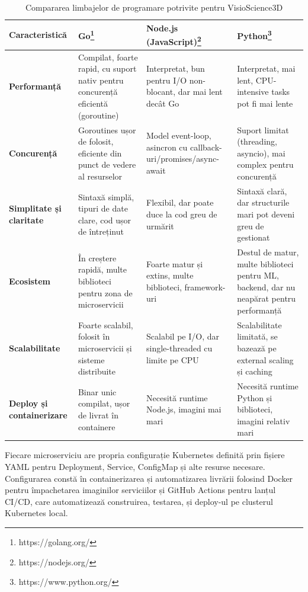 \begin{table}[h!]
\centering
\caption{Compararea limbajelor de programare potrivite pentru VisioScience3D}
\begin{tabular}{|p{2.5cm}|p{4cm}|p{4cm}|p{4cm}|}
\hline
\textbf{Caracteristică} & \textbf{Go\footnote{https://golang.org/}} & \textbf{Node.js (JavaScript)\footnote{https://nodejs.org/}} & \textbf{Python\footnote{https://www.python.org/}} \\
\hline
\textbf{Performanță} & Compilat, foarte rapid, cu suport nativ pentru concurență eficientă (goroutine) & Interpretat, bun pentru I/O non-blocant, dar mai lent decât Go & Interpretat, mai lent, CPU-intensive tasks pot fi mai lente \\
\hline
\textbf{Concurență} & Goroutines ușor de folosit, eficiente din punct de vedere al resurselor & Model event-loop, asincron cu callback-uri/promises/async-await & Suport limitat (threading, asyncio), mai complex pentru concurență \\
\hline
\textbf{Simplitate și claritate} & Sintaxă simplă, tipuri de date clare, cod ușor de întreținut & Flexibil, dar poate duce la cod greu de urmărit & Sintaxă clară, dar structurile mari pot deveni greu de gestionat \\
\hline
\textbf{Ecosistem} & În creștere rapidă, multe biblioteci pentru zona de microservicii & Foarte matur și extins, multe biblioteci, framework-uri & Destul de matur, multe biblioteci pentru ML, backend, dar nu neapărat pentru performanță \\
\hline
\textbf{Scalabilitate} & Foarte scalabil, folosit în microservicii și sisteme distribuite & Scalabil pe I/O, dar single-threaded cu limite pe CPU & Scalabilitate limitată, se bazează pe external scaling și caching \\
\hline
\textbf{Deploy și containerizare} & Binar unic compilat, ușor de livrat în containere & Necesită runtime Node.js, imagini mai mari & Necesită runtime Python și biblioteci, imagini relativ mari \\
\hline
\end{tabular}
\label{tab:comparatie-limbaje}
\end{table}


Fiecare microserviciu are propria configurație Kubernetes definită prin fișiere YAML pentru Deployment,
Service, ConfigMap și alte resurse necesare. Configurarea constă în containerizarea și automatizarea
livrării folosind Docker pentru împachetarea imaginilor serviciilor și GitHub Actions pentru lanțul CI/CD,
care automatizează construirea, testarea, și deploy-ul pe clusterul Kubernetes local.

